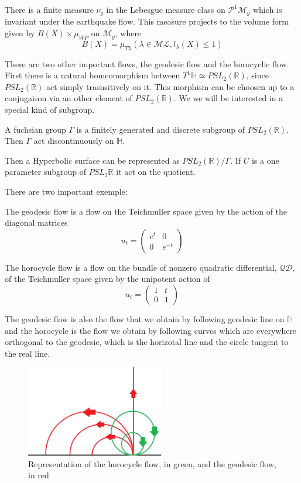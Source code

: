 There is a finite measure $\nu_g$ in the Lebesgue measure class on $\mathcal{P}^1 \mathcal{M}_g$ which is invariant under the earthquake flow. This measure projects to the volume form given by $B(X) \times \mu_{WP}$ on $\mathcal{M}_g$, where \[
B(X)=\mu_{Th}(\lambda \in \mathcal{ML}, l_\lambda(X) \leq 1)
\]

There are two other important flows, the geodesic flow and the horocyclic flow.
First there is a natural homeomorphism between $T^1 \mathbb{H}  \simeq PSL_2(\mathbb{R})$, since $PSL_2(\mathbb{R})$ act simply trasnsitively on it. This morphism can be choosen up to a conjugaison via an other element of $PSL_2(\mathbb{R})$. We we will be interested in a special kind of subgroup.

\begin{dfnt}
A fuchsian group $\Gamma$ is a finitely generated and discrete subgroup of $PSL_2(\mathbb{R})$. Then $\Gamma$ act discontinuously on $\mathbb{H}$.
\end{dfnt}

Then a Hyperbolic surface can be represented as $PSL_2(\mathbb{R})/ \Gamma$. If $U$ is a one parameter subgroup of $PSL_2{\mathbb{R}}$ it act on the quotient.

There are two important exemple:

\begin{dfnt}
The geodesic flow is a flow on the Teichmuller space given by the action of the diagonal matrices\[
u_t=\begin{pmatrix}
e^t & 0 \\
0 & e^{-t}
\end{pmatrix}
\]
\end{dfnt}

\begin{dfnt}
The horocycle flow is a flow on the bundle of nonzero quadratic differential, $\mathcal{QD}$, of the Teichmuller space given by the unipotent action of \[
u_t=\begin{pmatrix}
1 & t \\
0 & 1
\end{pmatrix}
\]
\end{dfnt}

The geodesic flow is also the flow that we obtain by following geodesic line on $\mathbb{H}$ and the horocycle is the flow we obtain by following curves which are everywhere orthogonal to the geodesic, which is the horizotal line and the circle tangent to the real line.

\begin{figure}[h!]
\centering
\includegraphics[width=6cm]{Image/FlowPaint.png}
\caption{Representation of the horocycle flow, in green, and the geodesic flow, in red}
\end{figure}


